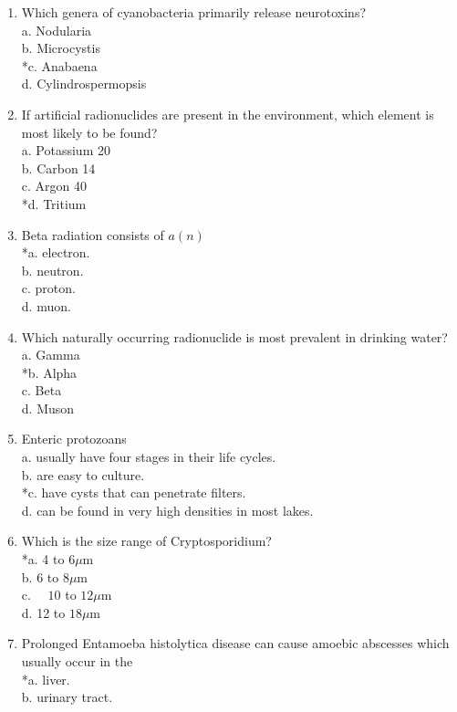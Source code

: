 \begin{enumerate}[1.]
\item Which genera of cyanobacteria primarily release neurotoxins?\\
a. Nodularia\\
b. Microcystis\\
*c. Anabaena\\
d. Cylindrospermopsis\\
\item If artificial radionuclides are present in the environment, which element is most likely to be found?\\
a. Potassium 20\\
b. Carbon 14\\
c. Argon 40\\
*d. Tritium\\
\item Beta radiation consists of $a(n)$\\
*a. electron.\\
b. neutron.\\
c. proton.\\
d. muon.\\
\item Which naturally occurring radionuclide is most prevalent in drinking water?\\
a. Gamma\\
*b. Alpha\\
c. Beta\\
d. Muson\\
\item Enteric protozoans\\
a. usually have four stages in their life cycles.\\
b. are easy to culture.\\
*c. have cysts that can penetrate filters.\\
d. can be found in very high densities in most lakes.\\
\item Which is the size range of Cryptosporidium?\\
*a. 4 to $6 \mu \mathrm{m}$\\
b. 6 to $8 \mu \mathrm{m}$\\
c. $\quad 10$ to $12 \mu \mathrm{m}$\\
d. 12 to $18 \mu \mathrm{m}$\\
\item Prolonged Entamoeba histolytica disease can cause amoebic abscesses which usually occur in the\\
*a. liver.\\
b. urinary tract.\\

\end{enumerate}
